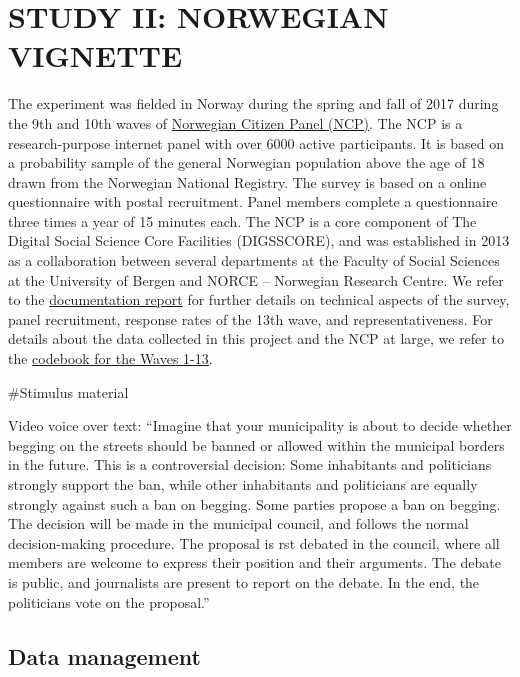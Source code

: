 \documentclass[
]{book}
\begin{document}
\hypertarget{part-study-ii-norwegian-vignette}{%
\part{STUDY II: NORWEGIAN VIGNETTE}\label{part-study-ii-norwegian-vignette}}

The experiment was fielded in Norway during the spring and fall of 2017 during the 9th and 10th waves of \href{https://www.uib.no/medborger}{Norwegian Citizen Panel (NCP)}. The NCP is a research-purpose internet panel with over 6000 active participants. It is based on a probability sample of the general Norwegian population above the age of 18 drawn from the Norwegian National Registry. The survey is based on a online questionnaire with postal recruitment. Panel members complete a questionnaire three times a year of 15 minutes each. The NCP is a core component of The Digital Social Science Core Facilities (DIGSSCORE), and was established in 2013 as a collaboration between several departments at the Faculty of Social Sciences at the University of Bergen and NORCE -- Norwegian Research Centre. We refer to the \href{Data/ncp-wave13-documentation.pdf}{documentation report} for further details on technical aspects of the survey, panel recruitment, response rates of the 13th wave, and representativeness. For details about the data collected in this project and the NCP at large, we refer to the \href{Data/ncp-wave13-codebook.pdf}{codebook for the Waves 1-13}.

\#Stimulus material

Video voice over text: ``Imagine that your municipality is about to decide whether begging on the streets should be banned or allowed within the municipal borders in the future. This is a controversial decision: Some inhabitants and politicians strongly support the ban, while other inhabitants and politicians are equally strongly against such a ban on begging. Some parties propose a ban on begging. The decision will be made in the municipal council, and follows the normal decision-making procedure. The proposal is rst debated in the council, where all members are welcome to express their position and their arguments. The debate is public, and journalists are present to report on the debate. In the end, the politicians vote on the proposal.''

\hypertarget{data-management-1}{%
\chapter{Data management}\label{data-management-1}}
\end{document}
